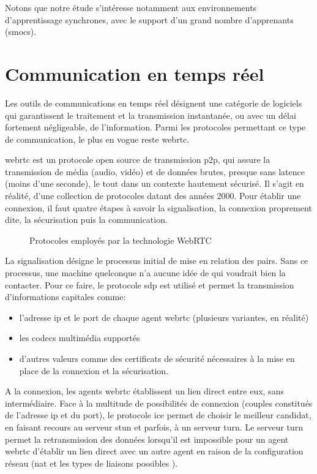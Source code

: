 Notons que notre étude s'intéresse notamment aux environnements d’apprentissage synchrones, 
avec le support d’un grand nombre d’apprenants (\acrshort{smoc}s).

\section{Communication en temps réel}
Les outils de communications en temps réel désignent une catégorie de logiciels qui garantissent le traitement et la transmission instantanée, 
ou avec un délai fortement négligeable,  de l’information. 
Parmi les protocoles permettant ce type de communication, le plus en vogue reste \acrfull{webrtc}.


\acrshort{webrtc} est un protocole open source de transmission \gls{p2p}, qui assure la transmission de média (audio, vidéo) 
et de données brutes, presque sans latence (moins d’une seconde), 
le tout dans un contexte hautement sécurisé. 
Il s’agit en réalité, d’une collection de protocoles datant des années 2000. 
Pour établir une connexion, il faut quatre étapes à savoir la signalisation, la connexion proprement dite, la sécurisation puis la communication.

\begin{figure}[H]
  \centering
  \caption{Protocoles employés par la technologie WebRTC}
  \label{fig:webrtc_protocols}
\end{figure}

La signalisation désigne le processus initial de mise en relation des pairs. 
Sans ce processus, une machine quelconque n’a aucune idée de qui voudrait bien la contacter. 
Pour ce faire, le protocole \acrshort{sdp} est utilisé et permet la transmission d’informations capitales comme:

\begin{itemize}
  \item l’adresse \acrshort{ip} et le port de chaque agent \acrshort{webrtc} (plusieurs variantes, en réalité)
  \item les codecs multimédia supportés
  \item d’autres valeurs comme des certificats de sécurité nécessaires à la mise en place de la connexion et la sécurisation.
\end{itemize}


A la connexion, les agents \acrshort{webrtc} établissent un lien direct entre eux, sans intermédiaire. 
Face à la multitude de possibilités de connexion (couples constitués de l’adresse \acrshort{ip} et du port), 
le protocole \acrshort{ice} permet de choisir le meilleur candidat, en faisant recours au serveur \acrshort{stun} et parfois, à un serveur \acrshort{turn}. 
Le serveur \acrshort{turn} permet la retransmission des données lorsqu’il est impossible pour un agent \acrshort{webrtc} d'établir un lien 
direct avec un autre agent en raison de la configuration réseau (\acrshort{nat} et les types de liaisons possibles \cite{nat_links}).

